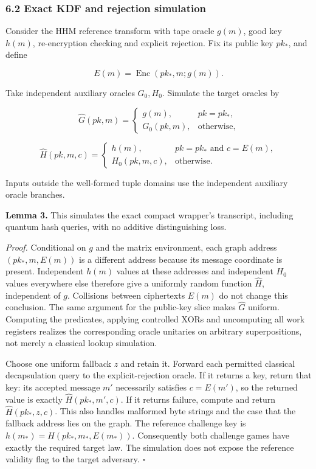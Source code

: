 \documentclass[11pt,a4paper]{article}
\begin{document}
\subsubsection{6.2 Exact KDF and rejection simulation}\label{exact-kdf-and-rejection-simulation}

Consider the HHM reference transform with tape oracle \(g(m)\), good key \(h(m)\), re-encryption checking and explicit rejection. Fix its public key \(pk_*\), and define

\[
E(m)=\operatorname{Enc}(pk_*,m;g(m)).
\]

Take independent auxiliary oracles \(G_0,H_0\). Simulate the target oracles by

\[
\widehat G(pk,m)=
\begin{cases}g(m),&pk=pk_*,\\G_0(pk,m),&\text{otherwise},\end{cases}
\]

\[
\widehat H(pk,m,c)=
\begin{cases}h(m),&pk=pk_*\text{ and }c=E(m),\\
H_0(pk,m,c),&\text{otherwise}.\end{cases}
\tag{2}
\]

Inputs outside the well-formed tuple domains use the independent auxiliary oracle branches.

\textbf{Lemma 3.} This simulates the exact compact wrapper's transcript, including quantum hash queries, with no additive distinguishing loss.

\emph{Proof.} Conditional on \(g\) and the matrix environment, each graph address \((pk_*,m,E(m))\) is a different address because its message coordinate is present. Independent \(h(m)\) values at these addresses and independent \(H_0\) values everywhere else therefore give a uniformly random function \(\widehat H\), independent of \(g\). Collisions between ciphertexts \(E(m)\) do not change this conclusion. The same argument for the public-key slice makes \(\widehat G\) uniform. Computing the predicates, applying controlled XORs and uncomputing all work registers realizes the corresponding oracle unitaries on arbitrary superpositions, not merely a classical lookup simulation.

Choose one uniform fallback \(z\) and retain it. Forward each permitted classical decapsulation query to the explicit-rejection oracle. If it returns a key, return that key: its accepted message \(m'\) necessarily satisfies \(c=E(m')\), so the returned value is exactly \(\widehat H(pk_*,m',c)\). If it returns failure, compute and return \(\widehat H(pk_*,z,c)\). This also handles malformed byte strings and the case that the fallback address lies on the graph. The reference challenge key is \(h(m_*)=\widehat H(pk_*,m_*,E(m_*))\). Consequently both challenge games have exactly the required target law. The simulation does not expose the reference validity flag to the target adversary. \(\square\)
\end{document}
